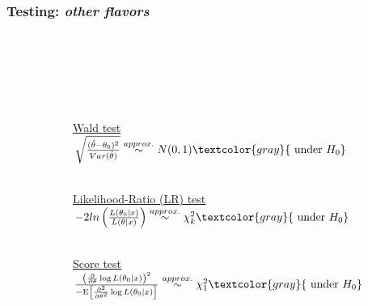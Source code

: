 \documentclass[xcolor={dvipsnames}]{beamer}
\begin{document}
\frame
{
 \frametitle{Testing: \emph{other flavors}}

\vspace{-.1in}

${}$\\${}$\\${}$\\${}$\\
\begin{columns}
\begin{column}{.6\textwidth}
\end{column}
\begin{column}{.55\textwidth}
\vspace{-.075in}

\underline{Wald test}\\
$\sqrt{\frac{(\hat \theta - \theta_0)^2}{Var(\hat \theta)}} \overset{\tiny approx.}{\sim} N(0,1) \textcolor{gray}{\text{ under } H_0}$\\${}$

\underline{Likelihood-Ratio (LR) test}\\
$-2ln\left(\frac{L(\theta_0|x)}{{L(\theta|x)}}\right) \overset{\tiny approx.}{\sim} \chi^2_k \textcolor{gray}{\text{ under } H_0}$\\${}$

\underline{Score test} \\
$\frac{\left(\frac{\partial}{\partial \theta } \log L(\theta_0|x)\right)^2}
{-\text{E}\left[\frac{\partial^2}{\partial \theta^2 } \log L(\theta_0|x)\right]} \overset{\tiny approx.}{\sim} \chi^2_1 \textcolor{gray}{\text{ under } H_0}$

\end{column}


\end{columns}
${}$\\${}$\\${}$\\${}$\\

}
\end{document}
